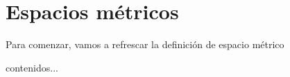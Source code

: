 \chapter{Espacios métricos}
Para comenzar, vamos a refrescar la definición de espacio métrico
\begin{defi}
	contenidos...
\end{defi}